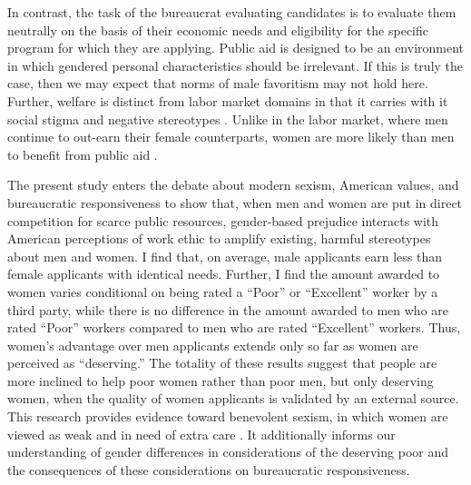 \documentclass[12pt]{article}%
\begin{document}
\begin{doublespace}
In contrast, the task of the bureaucrat evaluating candidates is to evaluate them neutrally on the basis of their economic needs and eligibility for the specific program for which they are applying. Public aid is designed to be an environment in which gendered personal characteristics should be irrelevant. If this is truly the case, then we may expect that norms of male favoritism may not hold here. Further, welfare is distinct from labor market domains in that it carries with it social stigma \citep{soss_lessons_1999} and negative stereotypes \citep{foster_welfare_2008, esping-andersen_welfare_2015}. Unlike in the labor market, where men continue to out-earn their female counterparts, women are more likely than men to benefit from public aid \citep{fraser_women_1989, lundberg-love_women_2012}.

The present study enters the debate about modern sexism, American values, and bureaucratic responsiveness to show that, when men and women are put in direct competition for scarce public resources, gender-based prejudice interacts with American perceptions of work ethic to amplify existing, harmful stereotypes about men and women. I find that, on average, male applicants earn less than female applicants with identical needs. Further, I find the amount awarded to women varies conditional on being rated a ``Poor” or ``Excellent” worker by a third party, while there is no difference in the amount awarded to men who are rated ``Poor” workers compared to men who are rated ``Excellent” workers. Thus, women’s advantage over men applicants extends only so far as women are perceived as ``deserving.” The totality of these results suggest that people are more inclined to help poor women rather than poor men, but only deserving women, when the quality of women applicants is validated by an external source. This research provides evidence toward benevolent sexism, in which women are viewed as weak and in need of extra care \citep{glick_hostile_1997, glick_ambivalent_2001}. It additionally informs our understanding of gender differences in considerations of the deserving poor and the consequences of these considerations on bureaucratic responsiveness.


\end{doublespace}
\end{document}
